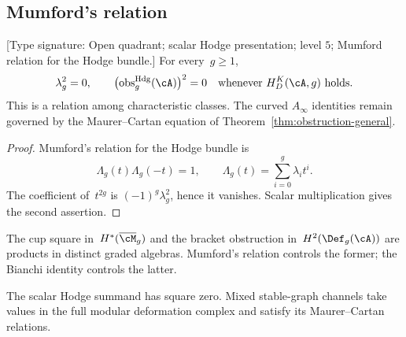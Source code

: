 \subsection{Mumford's relation}
\label{subsec:obstruction-squares-zero}

\begin{theorem}
\label{thm:obstruction-nilpotent}
\label{thm:obstruction-nilpotent-all-genera}
\label{thm:obstruction-nilpotent-higher}
\textup{[Type signature: Open quadrant; scalar Hodge presentation;
level $5$; Mumford relation for the Hodge bundle.]}
For every~$g\ge1$,
\begin{equation}
 \lambda_g^2=0,
 \qquad
 \bigl(\operatorname{obs}^{\mathrm{Hdg}}_g(\cA)\bigr)^2=0
 \quad\text{whenever }H_D^K(\cA,g)\text{ holds}.
 \label{eq:obs-squared-zero-all-genera}
\end{equation}
This is a relation among characteristic classes.  The curved
$A_\infty$ identities remain governed by the Maurer--Cartan equation
of Theorem~\ref{thm:obstruction-general}.
\end{theorem}

\begin{proof}
Mumford's relation for the Hodge bundle is
\begin{equation}
 \Lambda_g(t)\Lambda_g(-t)=1,
 \qquad
 \Lambda_g(t)=\sum_{i=0}^g\lambda_i t^i.
 \label{eq:mumford-relation}
\end{equation}
The coefficient of~$t^{2g}$ is $(-1)^g\lambda_g^2$, hence it
vanishes.  Scalar multiplication gives the second assertion.
\end{proof}

\begin{remark}
\label{rem:mumford-vs-dimension}
The cup square in~$H^*(\overline{\cM}_g)$ and the bracket obstruction
in~$H^2(\Def_g(\cA))$ are products in distinct graded algebras.
Mumford's relation controls the former; the Bianchi identity controls
the latter.
\end{remark}

\begin{remark}
\label{rem:multi-generator-nilpotence}
The scalar Hodge summand has square zero.  Mixed stable-graph channels
take values in the full modular deformation complex and satisfy its
Maurer--Cartan relations.
\end{remark}


